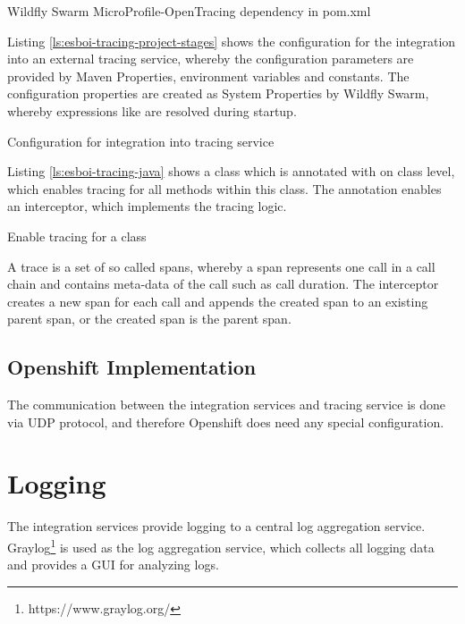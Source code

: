 \begin{listing}
	\caption{Wildfly Swarm MicroProfile-OpenTracing dependency in pom.xml}
	\label{ls:esboi-tracing-pom}
\end{listing}

Listing \vref{ls:esboi-tracing-project-stages} shows the configuration for the integration into an external tracing service, whereby the configuration parameters are provided by Maven Properties, environment variables and constants. The configuration properties are created as System Properties by Wildfly Swarm, whereby  expressions like  are resolved during startup.

\begin{listing}
	\caption{Configuration for integration into tracing service}
	\label{ls:esboi-tracing-project-stages}
\end{listing}

Listing \vref{ls:esboi-tracing-java} shows a class which is annotated with  on class level, which enables tracing for all methods within this class. The annotation  enables an interceptor, which implements the tracing logic. 

\begin{listing}
	\caption{Enable tracing for a class}
	\label{ls:esboi-tracing-java}
\end{listing}

A trace is a set of so called spans, whereby a span represents one call in a call chain and contains meta-data of the call such as call duration. The interceptor creates a new span for each call and appends the created span to an existing parent span, or the created span is the parent span. 

\subsection{Openshift Implementation}
\label{sec:esbi-tracing-openshift}
The communication between the integration services and tracing service is done via UDP protocol, and therefore Openshift does need any special configuration.

\section{Logging}
\label{sec:esbi-logging}
The integration services provide logging to a central log aggregation service. Graylog\footnote{https://www.graylog.org/} is used as the log aggregation service, which collects all logging data and provides a GUI for analyzing logs.
\newpage

